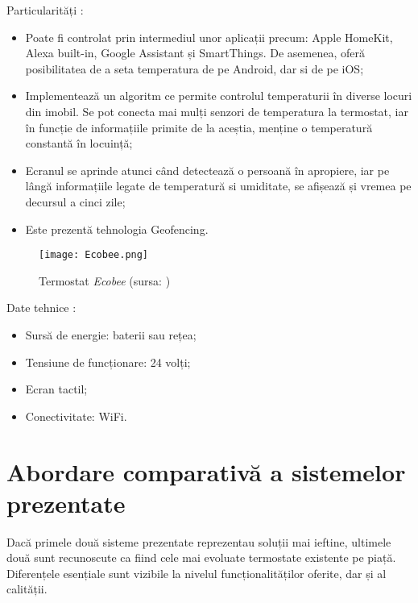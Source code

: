 \vspace{2em}

	Particularități \cite{ecobee}:
	\begin{itemize}
	\setlength{\itemindent}{2em}
		\itemsep0em
		\item Poate fi controlat prin intermediul unor aplicații precum: Apple HomeKit, Alexa built-in, Google Assistant și SmartThings. De asemenea, oferă posibilitatea de a seta temperatura de pe Android, dar si de pe iOS;
		\item Implementează un algoritm ce permite controlul temperaturii în diverse locuri din imobil. Se pot conecta mai mulți senzori de temperatura la termostat, iar în funcție de informațiile primite de la aceștia, menține o temperatură constantă în locuință;
		\item Ecranul se aprinde atunci când detectează o persoană în apropiere, iar pe lângă informațiile legate de temperatură si umiditate, se afișează și vremea pe decursul a cinci zile;
		\item Este prezentă tehnologia Geofencing.
	\end{itemize}

\vspace{2em}

\begin{wrapfigure}[5]{r}{0.5\textwidth}
	\centering
	\texttt{[image: Ecobee.png]}
	\caption{Termostat \textit{Ecobee} (sursa: \cite{ecobee})}
\end{wrapfigure}

	Date tehnice \cite{ecobee}:
	\begin{itemize}
	\setlength{\itemindent}{2em}
		\itemsep0em
		\item Sursă de energie: baterii sau rețea;
		\item Tensiune de funcționare: 24 volți;
		\item Ecran tactil;
		\item Conectivitate: WiFi.
	\end{itemize}
\vspace{0.5em}

\section{Abordare comparativă a sistemelor prezentate}
	Dacă primele două sisteme prezentate reprezentau soluții mai ieftine, ultimele două sunt recunoscute ca fiind cele mai evoluate termostate existente pe piață. Diferențele esențiale sunt vizibile la nivelul funcționalităților oferite, dar și al calității.

